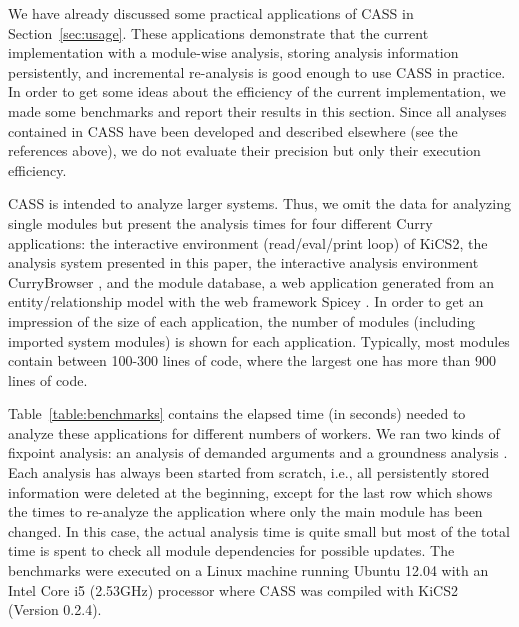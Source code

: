 \documentclass{llncs}
\begin{document}
We have already discussed some practical applications of CASS
in Section~\ref{sec:usage}.
These applications demonstrate that the current implementation
with a module-wise analysis,
storing analysis information persistently, and
incremental re-analysis is good enough to use CASS in practice.
In order to get some ideas about the efficiency of the
current implementation, we made some benchmarks
and report their results in this section.
Since all analyses contained in CASS have been developed and
described elsewhere (see the references above),
we do not evaluate their precision but only their execution efficiency.

CASS is intended to analyze larger systems.
Thus, we omit the data for analyzing single modules
but present the analysis times for four different
Curry applications:
the interactive environment (read/eval/print loop)
of KiCS2,
the analysis system presented in this paper,
the interactive analysis environment CurryBrowser \cite{Hanus06WLPE},
and the module database, a web application generated from
an entity/relationship model with the web framework
Spicey \cite{HanusKoschnicke10PADL}.
In order to get an impression of the size of each application,
the number of modules (including imported system modules)
is shown for each application.
Typically, most modules contain between 100-300 lines of code,
where the largest one has more than 900 lines of code.

Table~\ref{table:benchmarks} contains the elapsed time (in seconds)
needed to analyze
these applications for different numbers of workers.
We ran two kinds of fixpoint analysis: an analysis of demanded arguments
\cite{Hanus12ICLP} and a groundness analysis \cite{BrasselHanus05}.
Each analysis has always been started from scratch, i.e., all persistently
stored information were deleted at the beginning, except for
the last row which shows the times to re-analyze the application
where only the main module has been changed.
In this case, the actual analysis time is quite small
but most of the total time is spent to check all module dependencies
for possible updates.
The benchmarks were executed on a Linux machine running
Ubuntu 12.04 with an Intel Core i5 (2.53GHz) processor
where CASS was compiled with KiCS2 (Version 0.2.4).
\end{document}

